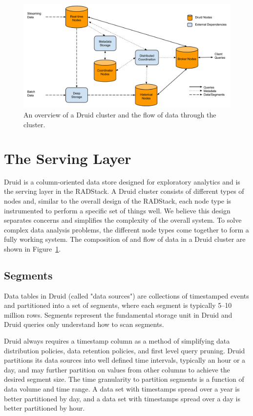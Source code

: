 \documentclass{vldb}
\begin{document}
\begin{figure}
\centering
\includegraphics[width = 4.5in]{cluster}
\caption{An overview of a Druid cluster and the flow of data through the cluster.}
\label{fig:cluster}
\end{figure}

\section{The Serving Layer}
\label{sec:serving}
Druid is a column-oriented data store designed for exploratory analytics and is
the serving layer in the RADStack. A Druid cluster consists of different types
of nodes and, similar to the overall design of the RADStack, each node type is
instrumented to perform a specific set of things well. We believe this design
separates concerns and simplifies the complexity of the overall system. To
solve complex data analysis problems, the different node types come together to
form a fully working system. The composition of and flow of data in a Druid
cluster are shown in Figure~\ref{fig:cluster}.

\subsection{Segments}
\label{sec:segments}
Data tables in Druid (called "data sources") are collections of timestamped
events and partitioned into a set of segments, where each segment is typically
5–10 million rows. Segments represent the fundamental storage unit in
Druid and Druid queries only understand how to scan segments. 

Druid always requires a timestamp column as a method of simplifying data
distribution policies, data retention policies, and first level query pruning.
Druid partitions its data sources into well defined time intervals, typically
an hour or a day, and may further partition on values from other columns to
achieve the desired segment size. The time granularity to partition segments is
a function of data volume and time range. A data set with timestamps spread
over a year is better partitioned by day, and a data set with timestamps spread
over a day is better partitioned by hour. 
\end{document}
